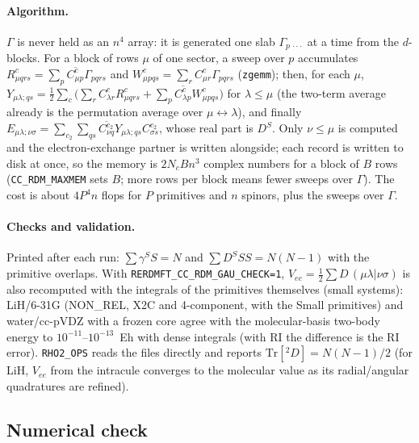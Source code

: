 \documentclass[11pt]{article}
\begin{document}
\paragraph{Algorithm.} $\Gamma$ is never held as an $n^4$ array: it is generated one slab $\Gamma_{p\,\cdot\cdot\cdot}$ at a time
from the $d$-blocks. For a block of rows $\mu$ of one sector, a sweep over $p$ accumulates
$R^c_{\mu qrs}=\sum_p\overline{C^c_{\mu p}}\Gamma_{pqrs}$ and $W^c_{\mu pqs}=\sum_rC^c_{\mu r}\Gamma_{pqrs}$ (\texttt{zgemm}); then, for each $\mu$,
$Y_{\mu\lambda;qs}=\tfrac12\sum_c\big(\sum_rC^c_{\lambda r}R^c_{\mu qrs}+\sum_p\overline{C^c_{\lambda p}}W^c_{\mu pqs}\big)$ for $\lambda\le\mu$ (the
two-term average already is the permutation average over $\mu\leftrightarrow\lambda$), and finally
$E_{\mu\lambda;\nu\sigma}=\sum_{c_2}\sum_{qs}\overline{C^{c_2}_{\nu q}}Y_{\mu\lambda;qs}C^{c_2}_{\sigma s}$, whose real part is $D^S$.
Only $\nu\le\mu$ is computed and the electron-exchange partner is written alongside; each record is written to disk at once, so the
memory is $2N_c B n^3$ complex numbers for a block of $B$ rows (\texttt{CC\_RDM\_MAXMEM} sets $B$; more rows per block means
fewer sweeps over $\Gamma$). The cost is about $4P^4n$ flops for $P$ primitives and $n$ spinors, plus the sweeps over $\Gamma$.

\paragraph{Checks and validation.} Printed after each run: $\sum\gamma^S S=N$ and $\sum D^SSS=N(N-1)$ with the primitive
overlaps. With \texttt{RERDMFT\_CC\_RDM\_GAU\_CHECK=1}, $V_{ee}=\tfrac12\sum D\,(\mu\lambda|\nu\sigma)$ is also recomputed with the
integrals of the primitives themselves (small systems): LiH/6-31G (NON\_REL, X2C and 4-component, with the Small primitives) and
water/cc-pVDZ with a frozen core agree with the molecular-basis two-body energy to $10^{-11}$--$10^{-13}$~Eh with dense integrals
(with RI the difference is the RI error). \texttt{RHO2\_OPS} reads the files directly and reports $\mathrm{Tr}[{}^2D]=N(N-1)/2$ (for LiH,
$V_{ee}$ from the intracule converges to the molecular value as its radial/angular quadratures are refined).

\subsection{Numerical check}
\label{sec:lambda-check}
\end{document}
